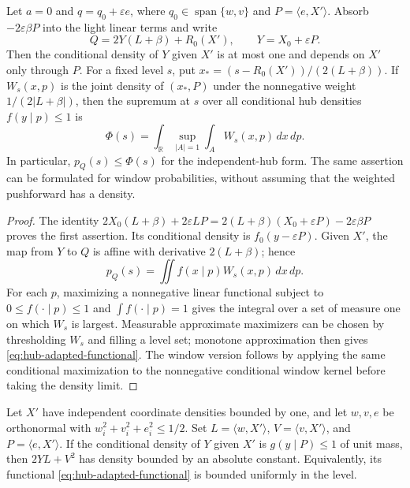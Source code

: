 \begin{proposition}
\label{prop:hub-adapted}
Let $a=0$ and $q=q_0+\varepsilon e$, where
$q_0\in\operatorname{span}\{w,v\}$ and $P=\langle e,X'\rangle$.
Absorb $-2\varepsilon\beta P$ into the light linear terms and write
\[
 Q=2Y(L+\beta)+R_0(X'),\qquad Y=X_0+\varepsilon P.
\]
Then the conditional density of $Y$ given $X'$ is at most one and
depends on $X'$ only through $P$.
For a fixed level $s$, put
$x_*=(s-R_0(X'))/(2(L+\beta))$.
If $W_s(x,p)$ is the joint density of $(x_*,P)$ under the
nonnegative weight $1/(2|L+\beta|)$, then the supremum at $s$ over
all conditional hub densities $f(y\mid p)\le1$ is
\begin{equation}\label{eq:hub-adapted-functional}
 \Phi(s)=\int_{\mathbb R}
       \sup_{|A|=1}\int_A W_s(x,p)\,dx\,dp.
\end{equation}
In particular, $p_Q(s)\le\Phi(s)$ for the independent-hub form.
The same assertion can be formulated for window probabilities, without
assuming that the weighted pushforward has a density.
\end{proposition}

\begin{proof}
The identity
$2X_0(L+\beta)+2\varepsilon LP
 =2(L+\beta)(X_0+\varepsilon P)-2\varepsilon\beta P$
proves the first assertion.  Its conditional density is
$f_0(y-\varepsilon P)$.
Given $X'$, the map from $Y$ to $Q$ is affine with derivative
$2(L+\beta)$; hence
\[
 p_Q(s)=\iint f(x\mid p)W_s(x,p)\,dx\,dp.
\]
For each $p$, maximizing a nonnegative linear functional subject to
$0\le f(\cdot\mid p)\le1$ and $\int f(\cdot\mid p)=1$
gives the integral over a set of measure one on which $W_s$ is largest.
Measurable approximate maximizers can be chosen by thresholding
$W_s$ and filling a level set; monotone approximation then gives
\eqref{eq:hub-adapted-functional}.  The window version follows by
applying the same conditional maximization to the nonnegative
conditional window kernel before taking the density limit.
\end{proof}

\begin{conjecture}
\label{conj:hub-adapted}
Let $X'$ have independent coordinate densities bounded by one, and let
$w,v,e$ be orthonormal with $w_i^2+v_i^2+e_i^2\le1/2$.
Set $L=\langle w,X'\rangle$, $V=\langle v,X'\rangle$, and
$P=\langle e,X'\rangle$.
If the conditional density of $Y$ given $X'$ is $g(y\mid P)\le1$
of unit mass, then $2YL+V^2$ has density bounded by an absolute constant.
Equivalently, its functional \eqref{eq:hub-adapted-functional} is
bounded uniformly in the level.
\end{conjecture}

